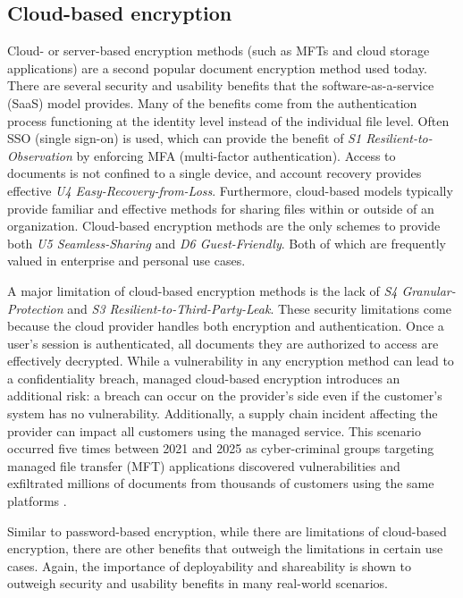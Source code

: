 \documentclass[sigconf]{acmart}
\begin{document}
\subsection{Cloud-based encryption}
Cloud- or server-based encryption methods (such as MFTs and cloud storage applications) are a second popular document encryption method used today. There are several security and usability benefits that the software-as-a-service (SaaS) model provides. Many of the benefits come from the authentication process functioning at the identity level instead of the individual file level. Often SSO (single sign-on) is used, which can provide the benefit of \textit{S1 Resilient-to-Observation} by enforcing MFA
(multi-factor authentication). Access to documents is not confined to a single device, and account recovery provides effective \textit{U4 Easy-Recovery-from-Loss}. Furthermore, cloud-based models typically provide familiar and effective methods for sharing files
within or outside of an organization. Cloud-based encryption methods are the only schemes to provide both \textit{U5 Seamless-Sharing} and \textit{D6 Guest-Friendly}. Both of which are frequently valued in enterprise and personal use cases. 

A major limitation of cloud-based encryption methods is the lack of \textit{S4 Granular-Protection} and \textit{S3 Resilient-to-Third-Party-Leak}. These security limitations come because the cloud provider handles both encryption and authentication. Once a user’s session
is authenticated, all documents they are authorized to access are effectively decrypted. While a vulnerability in any encryption method can lead to a confidentiality breach, managed cloud-based encryption introduces an additional risk: a breach can occur on the provider’s side even if the customer’s system has no vulnerability.
Additionally, a supply chain incident affecting the provider can impact all customers using the managed service. This scenario occurred five times between 2021 and 2025 as cyber-criminal groups targeting managed file transfer (MFT) applications discovered vulnerabilities and exfiltrated millions of documents from thousands of customers using the same platforms \cite{cisa_cl0p_2023, kondruss_moveit_2023,simas_unpacking_2023}.

Similar to password-based encryption, while there are
limitations of cloud-based encryption, there are other benefits that outweigh the limitations in certain use cases. Again, the importance of deployability and shareability is shown to outweigh security and usability benefits in many real-world scenarios.
\end{document}
